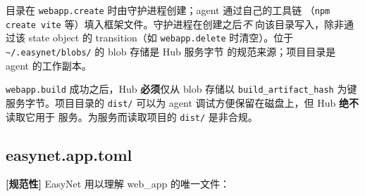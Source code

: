 \documentclass[11pt,a4paper]{article}
\newcommand{\normsv}{\textcolor{normativecolor}{\textbf{[规范性]}}\xspace}
\theoremstyle{definition}
\begin{document}
目录在 \texttt{webapp.create} 时由守护进程创建；agent 通过自己的工具链
（\texttt{npm create vite} 等）填入框架文件。守护进程在创建之后\emph{不}
向该目录写入，除非通过该 state object 的 transition（如
\texttt{webapp.delete} 时清空）。位于
\texttt{\textasciitilde/.easynet/blobs/} 的 blob 存储是 Hub 服务字节
的规范来源；项目目录是 agent 的工作副本。

\begin{invariant}[WB-INV-1]
\texttt{webapp.build} 成功之后，Hub \textbf{必须}仅从 blob 存储以
\texttt{build\_artifact\_hash} 为键服务字节。项目目录的 \texttt{dist/}
可以为 agent 调试方便保留在磁盘上，但 Hub \textbf{绝不}读取它用于
服务。为服务而读取项目的 \texttt{dist/} 是非合规。
\end{invariant}

\subsection{easynet.app.toml}

\normsv{} EasyNet 用以理解 web\_app 的唯一文件：
\end{document}
